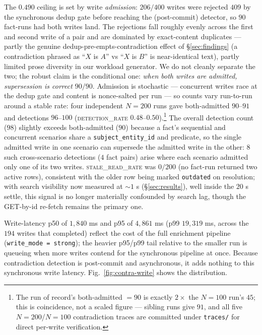 \documentclass[10pt,twocolumn,letterpaper]{article}
\begin{document}
The \(0.490\) ceiling is set by write \emph{admission}: \(206/400\) writes were rejected \(409\) by the synchronous dedup gate before reaching the (post-commit) detector, so \(90\) fact-runs had both writes land. The rejections fall roughly evenly across the first and second write of a pair and are dominated by exact-content duplicates --- partly the genuine dedup-pre-empts-contradiction effect of \S\ref{sec:findings} (a contradiction phrased as ``\(X\) is \(A\)'' vs ``\(X\) is \(B\)'' is near-identical text), partly limited prose diversity in our workload generator. We do not cleanly separate the two; the robust claim is the conditional one: \emph{when both writes are admitted, supersession is correct \(90/90\)}. Admission is stochastic --- concurrent writes race at the dedup gate and content is nonce-salted per run --- so counts vary run-to-run around a stable rate: four independent \(N{=}200\) runs gave both-admitted \(90\)--\(91\) and detections \(96\)--\(100\) (\textsc{detection\_rate} \(0.48\)--\(0.50\)).\footnote{The run of record's both-admitted \(=90\) is exactly \(2\times\) the \(N{=}100\) run's \(45\); this is coincidence, not a scaled figure --- sibling runs give \(91\), and all five \(N{=}200\)/\(N{=}100\) contradiction traces are committed under \texttt{traces/} for direct per-write verification.} The overall detection count (\(98\)) slightly exceeds both-admitted (\(90\)) because a fact's sequential and concurrent scenarios share a \texttt{subject\_entity\_id} and predicate, so the single admitted write in one scenario can supersede the admitted write in the other: \(8\) such cross-scenario detections (\(4\) fact pairs) arise where each scenario admitted only one of its two writes. \textsc{stale\_read\_rate} was \(0/200\) (no fact-run returned two active rows), consistent with the older row being marked \texttt{outdated} on resolution; with search visibility now measured at \(\sim\!1\) s (\S\ref{sec:results}), well inside the \(20\) s settle, this signal is no longer materially confounded by search lag, though the GET-by-id re-fetch remains the primary one.

Write-latency p50 of \(1{,}840\) ms and p95 of \(4{,}861\) ms (p99 \(19{,}319\) ms, across the \(194\) writes that completed) reflect the cost of the full enrichment pipeline (\texttt{write\_mode = strong}); the heavier p95/p99 tail relative to the smaller run is queueing when more writes contend for the synchronous pipeline at once. Because contradiction detection is post-commit and asynchronous, it adds nothing to this synchronous write latency. Fig.~\ref{fig:contra-write} shows the distribution.
\end{document}
